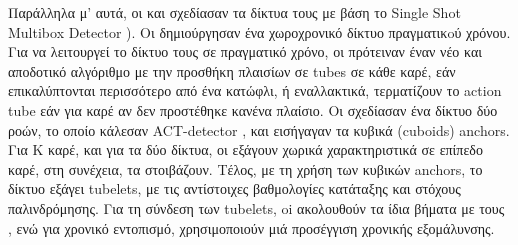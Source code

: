 Παράλληλα μ' αυτά, οι \en \cite{singh2016online} \gr και \en\cite{kalogeiton17iccv:hal-01519812} \gr  σχεδίασαν τα δίκτυα τους
με βάση το \en Single Shot Multibox Detector \cite{DBLP:journals/corr/LiuAESR15})\gr. Οι \en\cite{singh2016online} \gr δημιούργησαν
ένα  χωροχρονικό δίκτυο  πραγματικoύ χρόνου. Για να λειτουργεί το δίκτυο τους σε πραγματικό χρόνο, οι \en  \cite{singh2016online} \gr πρότειναν έναν νέο και αποδοτικό
αλγόριθμο με την προσθήκη πλαισίων σε \en tubes \gr σε κάθε καρέ, εάν επικαλύπτονται περισσότερο από ένα κατώφλι, ή  εναλλακτικά, τερματίζουν  το \en action tube \gr εάν για  καρέ
αν δεν προστέθηκε κανένα πλαίσιο. Οι \en\cite{kalogeiton17iccv:hal-01519812} \gr  σχεδίασαν ένα δίκτυο δύο ροών, το οποίο κάλεσαν
\en ACT-detector \gr, και εισήγαγαν τα κυβικά (\en cuboids) anchors\gr. Για K καρέ, και για τα δύο δίκτυα,
οι \en \cite{kalogeiton17iccv:hal-01519812} \gr εξάγουν  χωρικά χαρακτηριστικά σε επίπεδο καρέ, στη συνέχεια, τα στοιβάζουν.
Τέλος, με τη χρήση των κυβικών \en anchors\gr, το δίκτυο  εξάγει \en tubelets\gr,
με τις αντίστοιχες βαθμολογίες κατάταξης και στόχους παλινδρόμησης. Για τη σύνδεση των \en tubelets\gr, oi \en \cite{kalogeiton17iccv:hal-01519812} \gr  ακολουθούν 
τα ίδια βήματα με τους \en \cite{singh2016online}\gr, ενώ για χρονικό εντοπισμό, χρησιμοποιούν μιά προσέγγιση χρονικής εξομάλυνσης. \par

